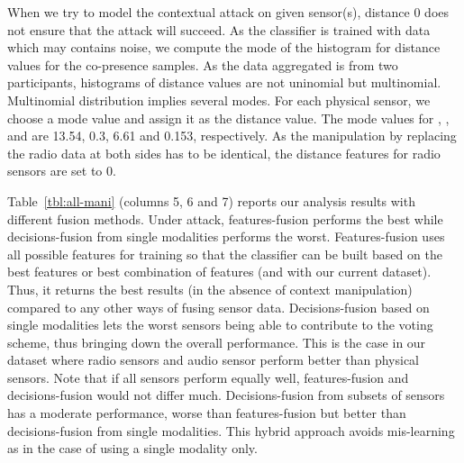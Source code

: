  When we try to model
the contextual attack on given sensor(s), distance 0 does not ensure that the attack will succeed.  As
the classifier is trained with data which may contains noise, we compute the
mode of the histogram for distance values for the co-presence samples. As the data
aggregated is from two participants, histograms of distance values are not
uninomial but multinomial. Multinomial distribution implies several modes. For
each physical sensor, we choose a mode value and assign it as the distance value.
The mode values for \altitude, \gas, \humidity and \temperature are 13.54, 0.3,
6.61 and 0.153, respectively. 
As the manipulation by replacing the radio data at
both sides has to be identical, the distance features for radio sensors are set to 0.
















Table~\ref{tbl:all-mani} (columns 5, 6 and 7) reports our analysis results with
different fusion methods. Under \zeromodal attack, features-fusion performs the
best while decisions-fusion from single modalities performs the worst.
Features-fusion uses all possible features for training so that the classifier
can be built based on the best features or best combination of features
(\bluetooth and \audio with our current dataset). Thus, it returns the
best results (in the absence of context manipulation) compared to any other
ways of fusing sensor data. Decisions-fusion based on single modalities lets
the worst sensors being able to contribute to the voting scheme, thus bringing
down the overall performance. This is the case in our dataset where radio
sensors and audio sensor perform better than physical sensors. Note that if all
sensors perform equally well, features-fusion and decisions-fusion would not
differ much. Decisions-fusion from subsets of sensors has a moderate
performance, worse than features-fusion but better than decisions-fusion from
single modalities.  This hybrid approach avoids mis-learning as in the case of
using a single modality only.

